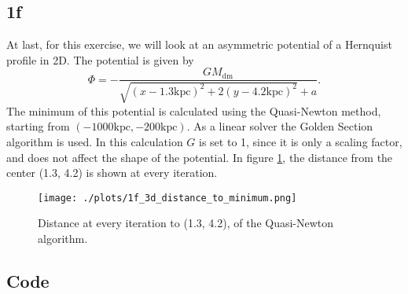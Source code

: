 \subsection*{1f}
At last, for this exercise, we will look at an asymmetric potential of a Hernquist profile in 2D. The potential is given by
\begin{equation}
  \Phi = - \frac{GM_\mathrm{dm}}{\sqrt{(x-1.3\mathrm{kpc})^2 + 2(y-4.2\mathrm{kpc})^2}+a}.
\end{equation}
The minimum of this potential is calculated using the Quasi-Newton method, starting from $(-1000 \mathrm{kpc}, -200\mathrm{kpc})$. As a linear solver the Golden Section algorithm is used. In this calculation $G$ is set to 1, since it is only a scaling factor, and does not affect the shape of the potential. In figure \ref{fig:1f}, the distance from the center (1.3, 4.2) is shown at every iteration.

\begin{figure}[!ht]
  \centering
  \texttt{[image: ./plots/1f\_3d\_distance\_to\_minimum.png]}
  \caption{Distance at every iteration to (1.3, 4.2), of the Quasi-Newton algorithm.}
  \label{fig:1f}
\end{figure}


\pagebreak

\subsection*{Code}



\newpage
